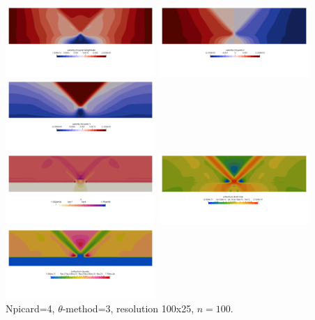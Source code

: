 \begin{center}
\includegraphics[width=5.7cm]{python_codes/fieldstone_87/results/experiment_10/meth3/vel}
\includegraphics[width=5.7cm]{python_codes/fieldstone_87/results/experiment_10/meth3/u}
\includegraphics[width=5.7cm]{python_codes/fieldstone_87/results/experiment_10/meth3/v}\\
\includegraphics[width=5.7cm]{python_codes/fieldstone_87/results/experiment_10/meth3/press}
\includegraphics[width=5.7cm]{python_codes/fieldstone_87/results/experiment_10/meth3/sr}
\includegraphics[width=5.7cm]{python_codes/fieldstone_87/results/experiment_10/meth3/eta}\\
{\captionfont Npicard=4, $\theta$-method=3, resolution 100x25, $n=100$.}
\end{center}

